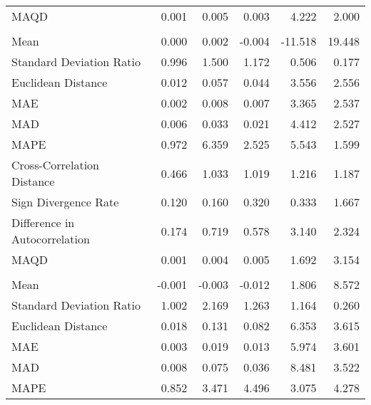 \begin{landscape}
\begin{ThreePartTable}
\begin{longtable}[t]{lrrrrr}
\hspace{1em}MAQD & 0.001 & 0.005 & 0.003 & 4.222 & 2.000\\
\addlinespace[0.5em]
\multicolumn{6}{l}{\textbf{DNK}}\\
\hline
\hspace{1em}Mean & 0.000 & 0.002 & -0.004 & -11.518 & 19.448\\
\hspace{1em}Standard Deviation Ratio & 0.996 & 1.500 & 1.172 & 0.506 & 0.177\\
\hspace{1em}Euclidean Distance & 0.012 & 0.057 & 0.044 & 3.556 & 2.556\\
\hspace{1em}MAE & 0.002 & 0.008 & 0.007 & 3.365 & 2.537\\
\hspace{1em}MAD & 0.006 & 0.033 & 0.021 & 4.412 & 2.527\\
\hspace{1em}MAPE & 0.972 & 6.359 & 2.525 & 5.543 & 1.599\\
\hspace{1em}Cross-Correlation Distance & 0.466 & 1.033 & 1.019 & 1.216 & 1.187\\
\hspace{1em}Sign Divergence Rate & 0.120 & 0.160 & 0.320 & 0.333 & 1.667\\
\hspace{1em}Difference in Autocorrelation & 0.174 & 0.719 & 0.578 & 3.140 & 2.324\\
\hspace{1em}MAQD & 0.001 & 0.004 & 0.005 & 1.692 & 3.154\\
\addlinespace[0.5em]
\multicolumn{6}{l}{\textbf{EGY}}\\
\hline
\hspace{1em}Mean & -0.001 & -0.003 & -0.012 & 1.806 & 8.572\\
\hspace{1em}Standard Deviation Ratio & 1.002 & 2.169 & 1.263 & 1.164 & 0.260\\
\hspace{1em}Euclidean Distance & 0.018 & 0.131 & 0.082 & 6.353 & 3.615\\
\hspace{1em}MAE & 0.003 & 0.019 & 0.013 & 5.974 & 3.601\\
\hspace{1em}MAD & 0.008 & 0.075 & 0.036 & 8.481 & 3.522\\
\hspace{1em}MAPE & 0.852 & 3.471 & 4.496 & 3.075 & 4.278\\

\end{longtable}
\end{ThreePartTable}
\end{landscape}
